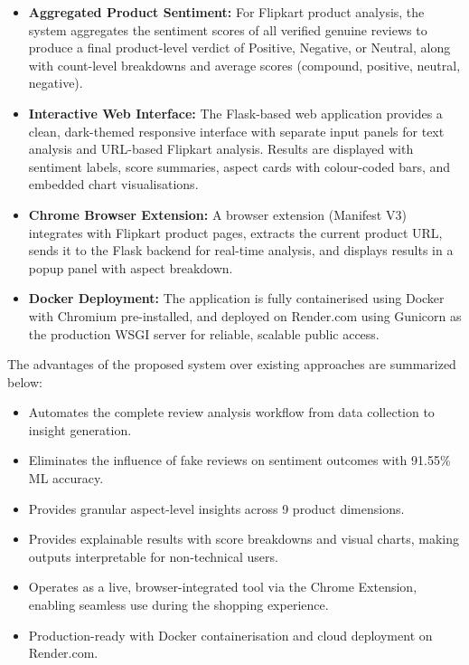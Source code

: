 \documentclass[12pt,a4paper]{report}
\begin{document}
\begin{itemize}
  \item \textbf{Aggregated Product Sentiment:} For Flipkart product analysis, the system aggregates the sentiment scores of all verified genuine reviews to produce a final product-level verdict of Positive, Negative, or Neutral, along with count-level breakdowns and average scores (compound, positive, neutral, negative).

  \item \textbf{Interactive Web Interface:} The Flask-based web application provides a clean, dark-themed responsive interface with separate input panels for text analysis and URL-based Flipkart analysis. Results are displayed with sentiment labels, score summaries, aspect cards with colour-coded bars, and embedded chart visualisations.

  \item \textbf{Chrome Browser Extension:} A browser extension (Manifest V3) integrates with Flipkart product pages, extracts the current product URL, sends it to the Flask backend for real-time analysis, and displays results in a popup panel with aspect breakdown.

  \item \textbf{Docker Deployment:} The application is fully containerised using Docker with Chromium pre-installed, and deployed on Render.com using Gunicorn as the production WSGI server for reliable, scalable public access.
\end{itemize}

The advantages of the proposed system over existing approaches are summarized below:

\begin{itemize}
  \item Automates the complete review analysis workflow from data collection to insight generation.
  \item Eliminates the influence of fake reviews on sentiment outcomes with 91.55\% ML accuracy.
  \item Provides granular aspect-level insights across 9 product dimensions.
  \item Provides explainable results with score breakdowns and visual charts, making outputs interpretable for non-technical users.
  \item Operates as a live, browser-integrated tool via the Chrome Extension, enabling seamless use during the shopping experience.
  \item Production-ready with Docker containerisation and cloud deployment on Render.com.
\end{itemize}
\end{document}
